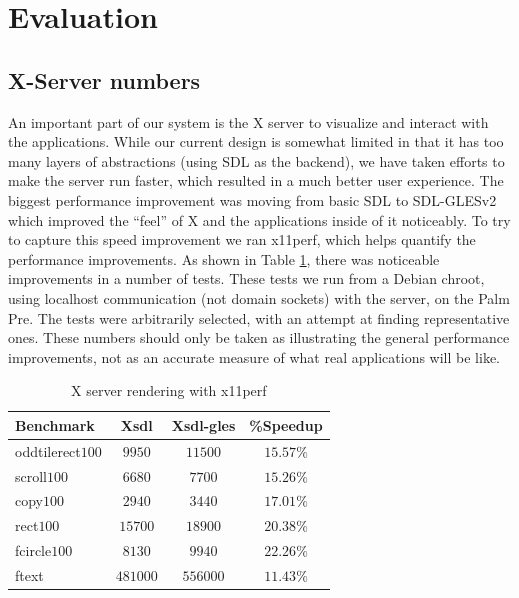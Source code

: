 \section{Evaluation}
\label{sec:eval}

\subsection{X-Server numbers}

An important part of our system is the X server to visualize and interact with the applications.  While our current design is somewhat limited in that it has too many layers of abstractions (using SDL as the backend), we have taken efforts to make the server run faster, which resulted in a much better user experience.  The biggest  performance improvement was moving from basic SDL to SDL-GLESv2 which improved the ``feel'' of X and the applications inside of it noticeably.  To try to capture this speed improvement we ran x11perf, which helps quantify the performance improvements.  As shown in Table \ref{tab:x_results}, there was noticeable improvements in a number of tests.
These tests we run from a Debian chroot, using localhost communication (not domain sockets) with the server, on the Palm Pre.  The tests were arbitrarily selected, with an attempt at finding representative ones.  These numbers should only be taken as illustrating the general performance improvements, not as an accurate measure of what real applications will be like.

\begin{table}[ht]
{\small
\hfill{}
\begin{tabular}{|l|c|c|c|}
\hline Benchmark & Xsdl & Xsdl-gles & \%Speedup \\ [2pt] 
\hline oddtilerect$100$ & $9950$ & $11500$ & $15.57\%$ \\ [2pt]
scroll$100$ & $6680$ & $7700$ & $15.26\%$ \\ [2pt]
copy$100$ & $2940$ & $3440$ & $17.01\%$ \\ [2pt]
rect$100$ & $15700$ & $18900$ & $20.38\%$ \\ [2pt]
fcircle$100$ & $8130$ & $9940$ & $22.26\%$ \\ [2pt]
ftext & $481000$ & $556000$ & $11.43\%$ \\ [2pt]
\hline 
\end{tabular}}
\hfill{}
\caption{ X server rendering with x11perf }
\label{tab:x_results}
\end{table}

